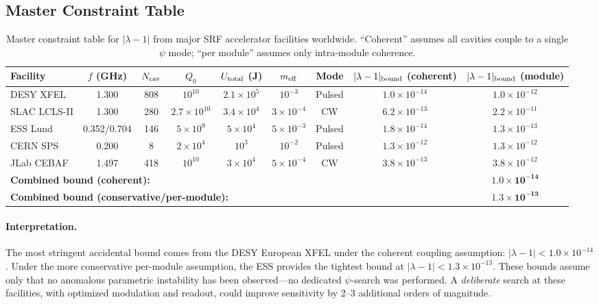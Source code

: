 \documentclass[aps,prd,twocolumn,superscriptaddress,floatfix,nofootinbib]{revtex4-2}
\newcommand{\lam}{\lambda}
\begin{document}
\subsection{Master Constraint Table}\label{sec:constraint-table}

\begin{table}[t]
\caption{Master constraint table for $|\lambda - 1|$ from major SRF
accelerator facilities worldwide. ``Coherent'' assumes all cavities
couple to a single $\psi$ mode; ``per module'' assumes only
intra-module coherence.}
\label{tab:srf-constraints}
\begin{ruledtabular}
\begin{tabular}{lcccccccc}
Facility & $f$ (GHz) & $N_{\rm cav}$ & $Q_0$ &
$U_{\rm total}$ (J) & $m_{\rm eff}$ & Mode &
$|\lam-1|_{\rm bound}$ (coherent) &
$|\lam-1|_{\rm bound}$ (module) \\
\hline
DESY XFEL & 1.300 & 808 & $10^{10}$ & $2.1\times10^5$ &
$10^{-3}$ & Pulsed &
$1.0\times10^{-14}$ & $1.0\times10^{-12}$ \\
SLAC LCLS-II & 1.300 & 280 & $2.7\times10^{10}$ & $3.4\times10^4$ &
$3\times10^{-4}$ & CW &
$6.2\times10^{-13}$ & $2.2\times10^{-11}$ \\
ESS Lund & 0.352/0.704 & 146 & $5\times10^9$ & $5\times10^4$ &
$5\times10^{-3}$ & Pulsed &
$1.8\times10^{-14}$ & $1.3\times10^{-13}$ \\
CERN SPS & 0.200 & 8 & $2\times10^4$ & $10^3$ &
$10^{-2}$ & Pulsed &
$1.3\times10^{-12}$ & $1.3\times10^{-12}$ \\
JLab CEBAF & 1.497 & 418 & $10^{10}$ & $3\times10^4$ &
$5\times10^{-4}$ & CW &
$3.8\times10^{-13}$ & $3.8\times10^{-12}$ \\
\hline
\multicolumn{8}{l}{\textbf{Combined bound (coherent):}}
& $\boldsymbol{1.0\times10^{-14}}$ \\
\multicolumn{8}{l}{\textbf{Combined bound (conservative/per-module):}}
& $\boldsymbol{1.3\times10^{-13}}$ \\
\end{tabular}
\end{ruledtabular}
\end{table}

\paragraph{Interpretation.}
The most stringent accidental bound comes from the DESY European XFEL
under the coherent coupling assumption:
$|\lam-1| < 1.0 \times 10^{-14}$. Under the more conservative
per-module assumption, the ESS provides the tightest bound at
$|\lam-1| < 1.3 \times 10^{-13}$. These bounds assume only that no
anomalous parametric instability has been observed---no dedicated
$\psi$-search was performed. A \emph{deliberate} search at these
facilities, with optimized modulation and readout, could improve
sensitivity by 2--3 additional orders of magnitude.
\end{document}
